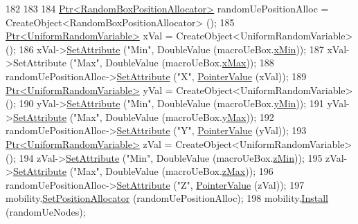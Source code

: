 \begin{DoxyCode}
182 
183 
184   \hyperlink{classns3_1_1Ptr}{Ptr<RandomBoxPositionAllocator>} randomUePositionAlloc = 
      CreateObject<RandomBoxPositionAllocator> ();
185   \hyperlink{classns3_1_1Ptr}{Ptr<UniformRandomVariable>} xVal = CreateObject<UniformRandomVariable> ();
186   xVal->\hyperlink{classns3_1_1ObjectBase_ac60245d3ea4123bbc9b1d391f1f6592f}{SetAttribute} (\textcolor{stringliteral}{"Min"}, DoubleValue (macroUeBox.\hyperlink{classns3_1_1Box_a1fd6a43d53258323331d34da600ff1c5}{xMin}));
187   xVal->SetAttribute (\textcolor{stringliteral}{"Max"}, DoubleValue (macroUeBox.\hyperlink{classns3_1_1Box_a50021049c756e770329145b25d9533a2}{xMax}));
188   randomUePositionAlloc->\hyperlink{classns3_1_1ObjectBase_ac60245d3ea4123bbc9b1d391f1f6592f}{SetAttribute} (\textcolor{stringliteral}{"X"}, \hyperlink{classns3_1_1PointerValue}{PointerValue} (xVal));
189   \hyperlink{classns3_1_1Ptr}{Ptr<UniformRandomVariable>} yVal = CreateObject<UniformRandomVariable> ();
190   yVal->\hyperlink{classns3_1_1ObjectBase_ac60245d3ea4123bbc9b1d391f1f6592f}{SetAttribute} (\textcolor{stringliteral}{"Min"}, DoubleValue (macroUeBox.\hyperlink{classns3_1_1Box_a3865ed092f941186823539c9979002f8}{yMin}));
191   yVal->\hyperlink{classns3_1_1ObjectBase_ac60245d3ea4123bbc9b1d391f1f6592f}{SetAttribute} (\textcolor{stringliteral}{"Max"}, DoubleValue (macroUeBox.\hyperlink{classns3_1_1Box_a001fd430a14b19efe925c818a332e392}{yMax}));
192   randomUePositionAlloc->\hyperlink{classns3_1_1ObjectBase_ac60245d3ea4123bbc9b1d391f1f6592f}{SetAttribute} (\textcolor{stringliteral}{"Y"}, \hyperlink{classns3_1_1PointerValue}{PointerValue} (yVal));
193   \hyperlink{classns3_1_1Ptr}{Ptr<UniformRandomVariable>} zVal = CreateObject<UniformRandomVariable> ();
194   zVal->\hyperlink{classns3_1_1ObjectBase_ac60245d3ea4123bbc9b1d391f1f6592f}{SetAttribute} (\textcolor{stringliteral}{"Min"}, DoubleValue (macroUeBox.\hyperlink{classns3_1_1Box_a9ab297b877a5c31dbfb344bd6f027e91}{zMin}));
195   zVal->\hyperlink{classns3_1_1ObjectBase_ac60245d3ea4123bbc9b1d391f1f6592f}{SetAttribute} (\textcolor{stringliteral}{"Max"}, DoubleValue (macroUeBox.\hyperlink{classns3_1_1Box_ae4d135764bbc8421fe82ec91e4693b59}{zMax}));
196   randomUePositionAlloc->\hyperlink{classns3_1_1ObjectBase_ac60245d3ea4123bbc9b1d391f1f6592f}{SetAttribute} (\textcolor{stringliteral}{"Z"}, \hyperlink{classns3_1_1PointerValue}{PointerValue} (zVal));
197   mobility.\hyperlink{classns3_1_1MobilityHelper_ac59d5295076be3cc11021566713a28c5}{SetPositionAllocator} (randomUePositionAlloc);
198   mobility.\hyperlink{classns3_1_1MobilityHelper_a07737960ee95c0777109cf2994dd97ae}{Install} (randomUeNodes);

\end{DoxyCode}
